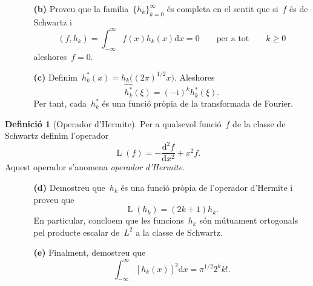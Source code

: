 \documentclass[a4paper]{article}
\theoremstyle{plain}
\theoremstyle{definition}
\newtheorem{definition}{Definició}
\DeclareMathOperator{\Lop}{L}
\newcommand{\iu}{\mathrm{i}}
\providecommand{\uppi}{\pi}
\newcommand{\diff}{\mathrm{d}}
\begin{document}
\begin{enumerate}
    \item[]\begin{enumerate}
        \item[\textbf{(b)}] Proveu que la família~\(\{h_{k}\}_{k=0}^{\infty}\)
            és completa en el sentit que si~\(f\) és de Schwartz i
            \[
                (f,h_{k}) = \int_{-\infty}^{\infty}f(x)h_{k}(x)\diff x = 0
                \qquad\text{per a tot}\qquad
                k\geq0
            \]
            aleshores~\(f=0\).
    \end{enumerate}
\end{enumerate}

\begin{enumerate}
    \item[]\begin{enumerate}
        \item[\textbf{(c)}]
            Definim~\(h^{\ast}_{k}(x)=h_{k}\bigl((2\uppi)^{1/2}x\bigr)\).
            Aleshores
            \[
                \widehat{h^{\ast}_{k}}(\xi) = (-\iu)^{k}h_{k}^{\ast}(\xi).
            \]
            Per tant, cada~\(h^{\ast}_{k}\) és una funció pròpia de la
            transformada de Fourier.
    \end{enumerate}
\end{enumerate}

\begin{definition}[Operador d'Hermite]
    Per a qualsevol funció~\(f\) de la classe de Schwartz definim l'operador
    \[
        \Lop(f) = -\frac{\diff^{2} f}{\diff x^{2}} + x^{2}f.
    \]
    Aquest operador s'anomena \emph{operador d'Hermite}.
\end{definition}

\begin{enumerate}
    \item[]\begin{enumerate}
        \item[\textbf{(d)}] Demostreu que~\(h_{k}\) és una funció pròpia de
            l'operador d'Hermite i proveu que
            \[
                \Lop(h_{k}) = (2k+1)h_{k}.
            \]
            En particular, concloem que les funcions~\(h_{k}\) són mútuament
            ortogonals pel producte escalar de~\(L^{2}\) a la classe de
            Schwartz.
    \end{enumerate}
\end{enumerate}

\begin{enumerate}
    \item[]\begin{enumerate}
        \item[\textbf{(e)}] Finalment, demostreu que
            \[
                \int_{-\infty}^{\infty}
                [h_{k}(x)]^{2}\diff x
                =
                \uppi^{1/2}2^{k}k!.
            \]
    \end{enumerate}
\end{enumerate}
\end{document}

